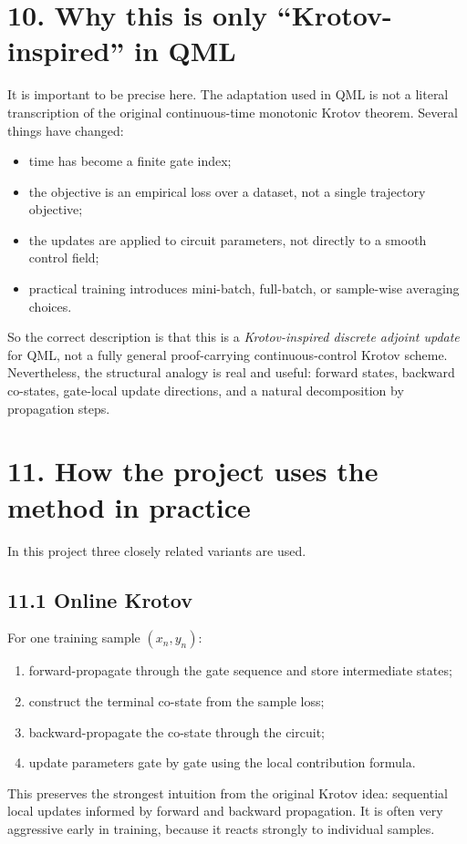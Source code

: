\documentclass[11pt]{article}
\begin{document}
\section*{10. Why this is only ``Krotov-inspired'' in QML}
It is important to be precise here. The adaptation used in QML is not a literal transcription of the original continuous-time monotonic Krotov theorem. Several things have changed:
\begin{itemize}
\item time has become a finite gate index;
\item the objective is an empirical loss over a dataset, not a single trajectory objective;
\item the updates are applied to circuit parameters, not directly to a smooth control field;
\item practical training introduces mini-batch, full-batch, or sample-wise averaging choices.
\end{itemize}

So the correct description is that this is a \emph{Krotov-inspired discrete adjoint update} for QML, not a fully general proof-carrying continuous-control Krotov scheme. Nevertheless, the structural analogy is real and useful: forward states, backward co-states, gate-local update directions, and a natural decomposition by propagation steps.

\section*{11. How the project uses the method in practice}
In this project three closely related variants are used.

\subsection*{11.1 Online Krotov}
For one training sample $(x_n,y_n)$:
\begin{enumerate}
\item forward-propagate through the gate sequence and store intermediate states;
\item construct the terminal co-state from the sample loss;
\item backward-propagate the co-state through the circuit;
\item update parameters gate by gate using the local contribution formula.
\end{enumerate}

This preserves the strongest intuition from the original Krotov idea: sequential local updates informed by forward and backward propagation. It is often very aggressive early in training, because it reacts strongly to individual samples.
\end{document}

